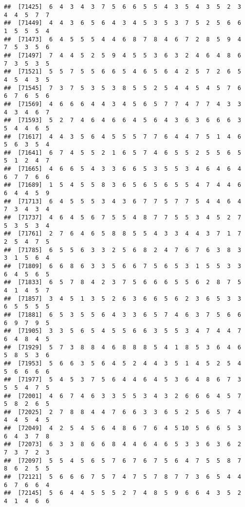 \documentclass[
]{book}
\begin{document}
\begin{verbatim}
##  [71425]  6  4  3  4  3  7  5  6  6  5  5  4  3  5  4  3  5  2  3  4  4  5  7  7
##  [71449]  4  4  3  6  5  6  4  3  4  5  3  5  3  7  5  2  5  6  6  1  5  5  5  4
##  [71473]  6  4  5  5  5  4  4  6  8  7  8  4  6  7  2  8  5  9  4  7  5  3  5  6
##  [71497]  7  4  4  5  2  5  9  4  5  5  3  6  3  2  4  6  4  8  6  7  3  5  3  5
##  [71521]  5  5  7  5  5  6  6  5  4  6  5  6  4  2  5  7  2  6  5  4  5  4  3  5
##  [71545]  7  3  7  5  3  5  3  8  5  5  2  5  4  4  5  4  5  7  6  6  7  6  5  6
##  [71569]  4  6  6  6  4  4  3  4  5  6  5  7  7  4  7  7  4  3  3  4  3  4  6  7
##  [71593]  5  2  7  4  6  4  6  6  4  5  6  4  3  6  3  6  6  6  3  5  4  4  6  5
##  [71617]  4  4  3  5  6  4  5  5  5  7  7  6  4  4  7  5  1  4  6  5  6  3  5  4
##  [71641]  6  7  4  5  5  2  1  6  5  7  4  6  5  5  2  5  5  6  5  5  1  2  4  7
##  [71665]  4  6  6  5  4  3  3  6  6  5  3  5  5  3  4  6  4  6  4  6  7  7  6  6
##  [71689]  1  5  4  5  5  8  3  6  5  6  5  6  5  5  4  7  4  4  6  6  4  4  5  9
##  [71713]  6  4  5  5  5  3  4  3  6  7  7  5  7  7  5  4  4  6  4  7  3  4  3  4
##  [71737]  4  6  4  5  6  7  5  5  4  8  7  7  5  5  3  4  5  2  7  5  3  5  3  4
##  [71761]  2  7  6  4  6  5  8  8  5  5  4  3  3  4  4  3  7  1  7  2  5  4  7  5
##  [71785]  6  5  5  6  3  3  2  5  6  8  2  4  7  6  7  6  3  8  3  3  1  5  6  4
##  [71809]  6  6  8  6  3  3  5  6  6  7  5  6  5  3  1  5  5  3  3  6  4  5  6  5
##  [71833]  6  5  7  8  4  2  3  7  5  6  6  6  5  5  6  2  8  7  5  4  1  4  5  7
##  [71857]  3  4  5  1  3  5  2  6  3  6  6  5  6  2  3  6  5  3  3  6  5  5  5  5
##  [71881]  6  5  3  5  5  6  4  3  3  6  5  7  4  6  3  7  5  6  6  6  9  7  9  5
##  [71905]  3  3  5  6  5  4  5  5  6  6  3  5  5  3  4  7  4  4  7  6  4  8  4  5
##  [71929]  5  7  3  8  8  4  6  8  8  8  5  4  1  8  5  3  6  4  6  5  8  5  3  6
##  [71953]  5  6  6  3  5  6  4  5  2  4  4  3  5  1  4  5  2  5  4  5  6  6  6  6
##  [71977]  5  4  5  3  7  5  6  4  4  6  4  5  3  6  4  8  6  7  3  5  5  4  7  5
##  [72001]  4  6  7  4  6  3  3  5  5  3  4  3  2  6  6  6  4  5  7  5  8  2  6  5
##  [72025]  2  7  8  8  4  4  7  6  6  3  3  6  5  2  5  6  5  7  4  4  4  5  4  5
##  [72049]  4  2  5  4  5  6  4  8  6  7  6  4  5 10  5  6  6  5  3  6  4  3  7  8
##  [72073]  6  3  3  8  6  6  8  4  4  6  4  6  5  3  3  6  3  6  2  7  3  7  2  3
##  [72097]  5  5  4  5  6  5  7  6  7  6  7  5  6  4  7  5  5  8  7  8  6  2  5  5
##  [72121]  5  6  6  6  7  5  7  4  7  5  7  8  7  7  3  6  5  4  4  6  7  6  6  4
##  [72145]  5  6  4  4  5  5  5  2  7  4  8  5  9  6  6  4  3  5  2  4  1  4  6  6

\end{verbatim}
\end{document}
